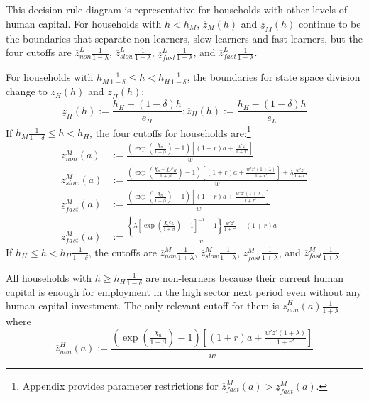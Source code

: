 \documentclass[12pt]{article}
\begin{document}
This decision rule diagram is representative for households with other levels of human capital. For households with $h<h_M$, $\overline{z}_M(h)$ and $\underline{z}_M(h)$ continue to be the boundaries that separate non-learners, slow learners and fast learners, but the four cutoffs are $\overline{z}^L_{non}\frac{1}{1-\lambda}$, $\overline{z}^L_{slow}\frac{1}{1-\lambda}$, $\underline{z}^L_{fast}\frac{1}{1-\lambda}$, and $\overline{z}^L_{fast}\frac{1}{1-\lambda}$.

For households with $h_M\frac{1}{1-\delta} \leq h<h_H\frac{1}{1-\delta}$, the boundaries for state space division change to $\overline{z}_H(h)$ and $\underline{z}_H(h)$:
\begin{equation}\label{eq:zh}
    \underline{z}_H(h):=\frac{h_H-(1-\delta)h}{e_H}; \overline{z}_H(h):=\frac{h_H-(1-\delta)h}{e_L} 
\end{equation}
If $h_M\frac{1}{1-\delta} \leq h<h_H$, the four cutoffs for households are:\footnote{Appendix provides parameter restrictions for $\overline{z}^M_{fast}(a)>\underline{z}^M_{fast}(a)$.}
\begin{align}
\overline{z}^M_{non}(a)&:=\frac{(\exp(\frac{\chi_n}{1+\beta})-1)[(1+r)a+\frac{w'z'}{1+r'}]}{w}  \label{eq:z-non-M} \\
\overline{z}^M_{slow}(a)&:=\frac{(\exp(\frac{\chi_n-\chi_e e_H}{1+\beta})-1)[(1+r)a+\frac{w'z'(1+\lambda)}{1+r'}]+\lambda\frac{w'z'}{1+r'}}{w} \label{eq:z-slow-M} \\
\underline{z}^M_{fast}(a)&:=\frac{(\exp(\frac{\chi_n}{1+\beta})-1)[(1+r)a+\frac{w'z'(1+\lambda)}{1+r'}]}{w} \label{eq:z-fast-lower-M} \\
\overline{z}^M_{fast}(a)&:=\frac{\left\{\lambda\left[\exp(\frac{\chi_e e_L}{1+\beta})-1\right]^{-1}-1\right\}\frac{w'z'}{1+r'}-(1+r)a}{w}  \label{eq:z-fast-upper_M} 
\end{align}
If $h_H \leq h<h_H\frac{1}{1-\delta}$, the cutoffs are $\overline{z}^M_{non}\frac{1}{1+\lambda}$, $\overline{z}^M_{slow}\frac{1}{1+\lambda}$, $\underline{z}^M_{fast}\frac{1}{1+\lambda}$, and $\overline{z}^M_{fast}\frac{1}{1+\lambda}$.


All households with $h \geq h_H\frac{1}{1-\delta}$ are non-learners because their current human capital is enough for employment in the high sector next period even without any human capital investment. The only relevant cutoff for them is $\overline{z}^H_{non}(a)\frac{1}{1+\lambda}$ where
\begin{equation}
    \overline{z}^H_{non}(a):=\frac{(\exp(\frac{\chi_n}{1+\beta})-1)[(1+r)a+\frac{w'z'(1+\lambda)}{1+r'}]}{w}  \label{eq:z-non-H} 
\end{equation}
\end{document}
